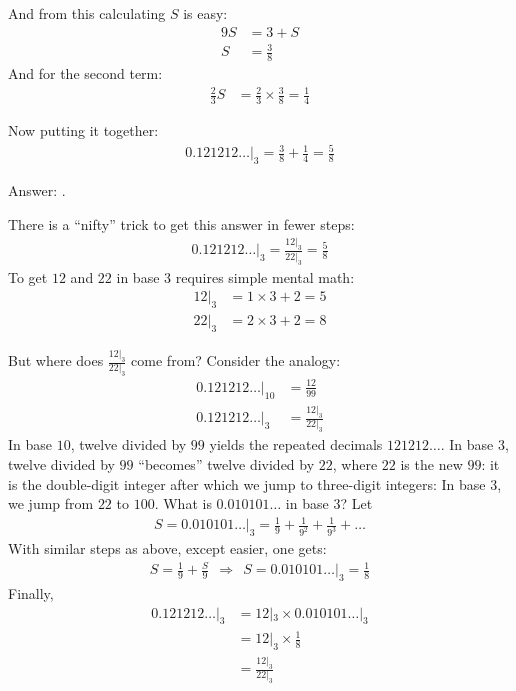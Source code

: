 \documentclass[12pt]{article}
\begin{document}
\begin{answer}
And from this calculating $S$ is easy:
\begin{align*}
9S  & = 3 + S \\
S & = \frac{3}{8}
\end{align*}
And for the second term:
\begin{align*}
\frac{2}{3} S & = \frac{2}{3} \times \frac{3}{8} = \frac{1}{4}
\end{align*}

Now putting it together:
\begin{align*}
0.121212\ldots|_{3} 
= \frac{3}{8} + \frac{1}{4} 
= \frac{5}{8}
\end{align*}

Answer: .
\bigskip

There is a ``nifty'' trick to get this answer in fewer steps:
\begin{align*}
0.121212\ldots|_{3} = \frac{12|_{3}}{22|_{3}} = \frac{5}{8}
\end{align*}
To get $12$ and $22$ in base $3$ requires simple mental math: 
\begin{align*}
12|_{3} & = 1 \times 3 + 2 = 5 \\
22|_{3} & = 2 \times 3 + 2 = 8
\end{align*}

But where does $\tfrac{12|_{3}}{22|_{3}}$ come from? Consider the analogy:
\begin{align*}
0.121212\ldots|_{10} & = \frac{12}{99} \\
0.121212\ldots|_{3}~ & = \frac{12|_{3}}{22|_{3}} 
\end{align*}
In base $10$, twelve divided by $99$ yields the repeated decimals $121212\ldots$. In base $3$, twelve divided by $99$ ``becomes'' twelve divided by $22$, where $22$ is the new $99$: it is the double-digit integer after which we jump to three-digit integers: In base $3$, we jump from $22$ to $100$. What is $0.010101\ldots$ in base $3$? Let
\begin{align*}
S = 0.010101\ldots|_{3} 
  = \frac{1}{9} + \frac{1}{9^2} + \frac{1}{9^3} +\ldots
\end{align*}
With similar steps as above, except easier, one gets:
\begin{align*}
S = \frac{1}{9} + \frac{S}{9} ~~\Rightarrow~~ 
S = 0.010101\ldots|_{3} = \frac{1}{8} 
\end{align*}
Finally,
\begin{align*}
0.121212\ldots|_{3} 
& = 12|_{3} \times 0.010101\ldots|_{3}\\
& = 12|_{3} \times \frac{1}{8} \\
& = \frac{12|_{3}}{22|_{3}}
\end{align*}
\end{answer}
\end{document}
